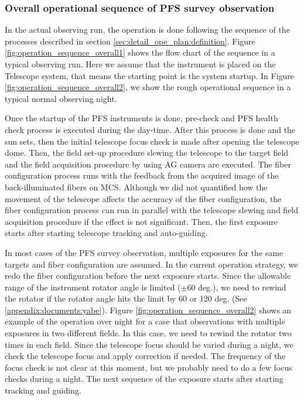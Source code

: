 \documentclass[a4paper]{article}
\begin{document}
\subsubsection{Overall operational sequence of PFS survey observation \label{sec:detail_ope_plan:overall}}

In the actual observing run, the operation is done following the sequence of the processes described in section \ref{sec:detail_ope_plan:definition}. Figure \ref{fig:operation_sequence_overall1} shows the flow chart of the sequence in a typical observing run. Here we assume that the instrument is placed on the Telescope system, that means the starting point is the system startup. In Figure \ref{fig:operation_sequence_overall2}, we show the rough operational sequence in a typical normal observing night. 

Once the startup of the PFS instruments is done, pre-check and PFS health check process is executed during the day-time. After this process is done and the sun sets, then the initial telescope focus check is made after opening the telescope dome. Then, the field set-up procedure slewing the telescope to the target field and the field acquisition procedure by using AG camera are executed. The fiber configuration process runs with the feedback from the acquired image of the back-illuminated fibers on MCS. Although we did not quantified how the movement of the telescope affects the accuracy of the fiber configuration, the fiber configuration process can run in parallel with the telescope slewing and field acquisition procedure if the effect is not significant. Then, the first exposure starts after starting telescope tracking and auto-guiding. 

In most cases of the PFS survey observation, multiple exposures for the same targets and fiber configuration are assumed. In the current operation strategy, we redo the fiber configuration before the next exposure starts. Since the allowable range of the instrument rotator angle is limited ($\pm 60$ deg.), we need to rewind the rotator if the rotator angle hits the limit by 60 or 120 deg. (See \ref{appendix:documents:yabe}). Figure \ref{fig:operation_sequence_overall2} shows an example of the operation over night for a case that observations with multiple exposures in two different fields. In this case, we need to rewind the rotator two times in each field. Since the telescope focus should be varied during a night, we check the telescope focus and apply correction if needed. The frequency of the focus check is not clear at this moment, but we probably need to do a few focus checks during a night. The next sequence of the exposure starts after starting tracking and guiding.
\end{document}
